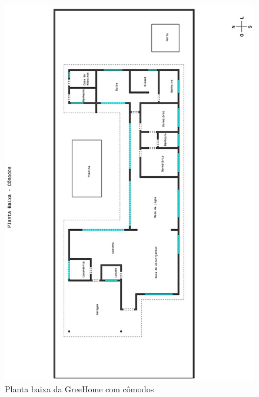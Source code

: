 \newpage

\begin{figure}[H]
  \begin{center}
	\includegraphics[keepaspectratio,scale=0.6,angle=270]{figuras/planta_comodos.eps}
	\caption{Planta baixa da GreeHome com cômodos}
  \end{center}
\end{figure}

